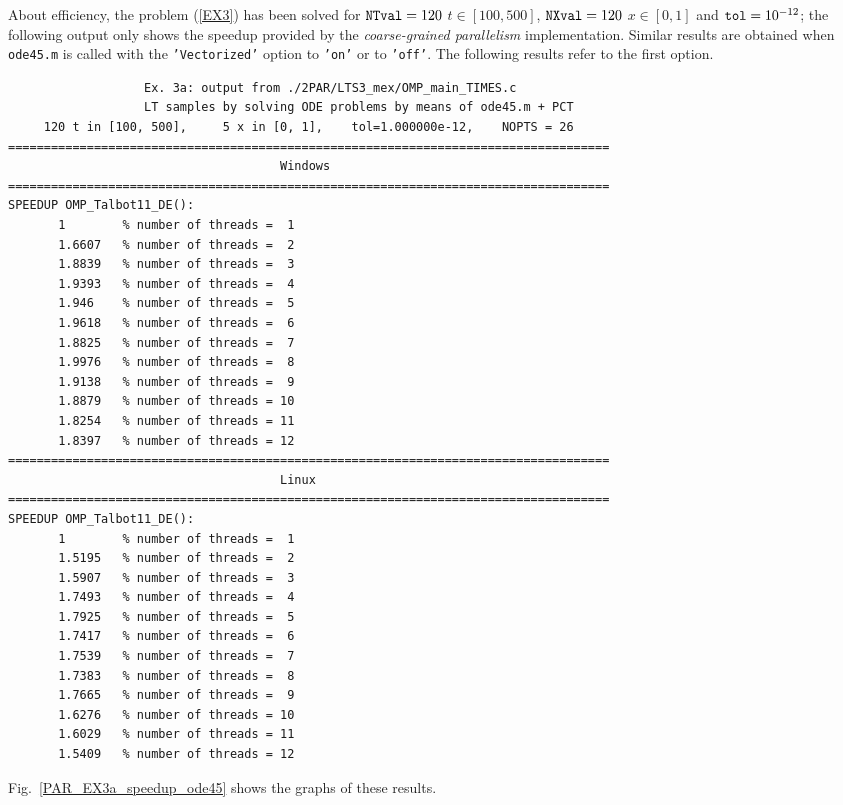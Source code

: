 \documentclass[a4paper,10pt]{report}%
\begin{document}
About efficiency, the problem (\ref{EX3}) has been solved for ${\tt NTval}=120$ $t\in[100,500]$, ${\tt NXval}=120$
$x\in[0,1]$ and ${\tt tol}=10^{-12}$; the following output only shows the speedup provided by the
{\em coarse-grained parallelism} implementation.
Similar results are obtained when {\tt ode45.m} is called with the {\tt 'Vectorized'} option to {\tt 'on'} or
to {\tt 'off'}. The following results refer to the first option.
\begin{lstlisting}
                   Ex. 3a: output from ./2PAR/LTS3_mex/OMP_main_TIMES.c
                   LT samples by solving ODE problems by means of ode45.m + PCT
     120 t in [100, 500],     5 x in [0, 1],    tol=1.000000e-12,    NOPTS = 26
====================================================================================
                                      Windows
====================================================================================
SPEEDUP OMP_Talbot11_DE():
       1        % number of threads =  1
       1.6607   % number of threads =  2
       1.8839   % number of threads =  3
       1.9393   % number of threads =  4
       1.946    % number of threads =  5
       1.9618   % number of threads =  6
       1.8825   % number of threads =  7
       1.9976   % number of threads =  8
       1.9138   % number of threads =  9
       1.8879   % number of threads = 10
       1.8254   % number of threads = 11
       1.8397   % number of threads = 12
====================================================================================
                                      Linux
====================================================================================
SPEEDUP OMP_Talbot11_DE():
       1        % number of threads =  1
       1.5195   % number of threads =  2
       1.5907   % number of threads =  3
       1.7493   % number of threads =  4
       1.7925   % number of threads =  5
       1.7417   % number of threads =  6
       1.7539   % number of threads =  7
       1.7383   % number of threads =  8
       1.7665   % number of threads =  9
       1.6276   % number of threads = 10
       1.6029   % number of threads = 11
       1.5409   % number of threads = 12
\end{lstlisting}
Fig.~\ref{PAR_EX3a_speedup_ode45} shows the graphs of these results.
\end{document}
